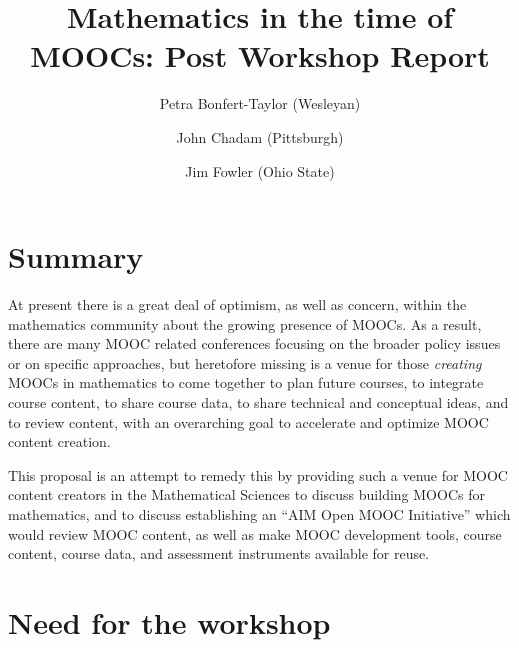 \documentclass[12pt]{amsart}
\title{Mathematics in the time of MOOCs: Post Workshop Report}
\author[Bonfert-Taylor]{Petra Bonfert-Taylor (Wesleyan)}
\author[Chadam]{John Chadam (Pittsburgh)}
\author[Fowler]{Jim Fowler (Ohio State)}
\begin{document}
\maketitle

\section{Summary}

At present there is a great deal of optimism, as well as concern,
within the mathematics community about the growing presence of MOOCs.
As a result, there are many MOOC related conferences focusing on the
broader policy issues or on specific approaches, but heretofore
missing is a venue for those \textit{creating} MOOCs in mathematics to
come together to plan future courses, to integrate course content, to
share course data, to share technical and conceptual ideas, and to
review content, with an overarching goal to accelerate and optimize
MOOC content creation.

This proposal is an attempt to remedy this by providing such a venue
for MOOC content creators in the Mathematical Sciences to discuss
building MOOCs for mathematics, and to discuss establishing an ``AIM
Open MOOC Initiative'' which would review MOOC content, as well as
make MOOC development tools, course content, course data, and
assessment instruments available for reuse.

\section{Need for the workshop}
\end{document}
